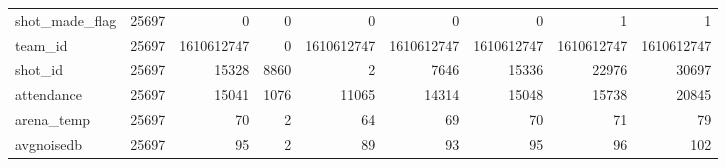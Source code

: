 {\begin{tabular}{lrrrrrrrr}
    shot\_made\_flag    &  25697 &          0 &       0 &          0 &          0 &          0 &          1 &          1 \\
    team\_id           &  25697 & 1610612747 &       0 & 1610612747 & 1610612747 & 1610612747 & 1610612747 & 1610612747 \\
    shot\_id           &  25697 &      15328 &    8860 &          2 &       7646 &      15336 &      22976 &      30697 \\
    attendance        &  25697 &      15041 &    1076 &      11065 &      14314 &      15048 &      15738 &      20845 \\
    arena\_temp        &  25697 &         70 &       2 &         64 &         69 &         70 &         71 &         79 \\
    avgnoisedb        &  25697 &         95 &       2 &         89 &         93 &         95 &         96 &        102 \\
    \bottomrule
    \end{tabular}}
    \label{tbl:featuresummary}
    \bigbreak


